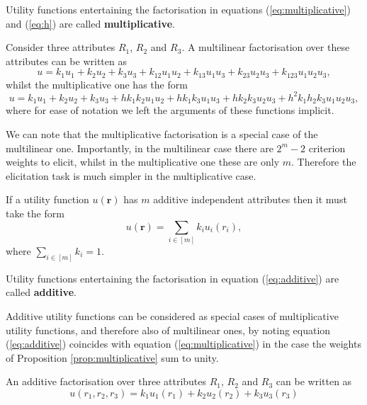 \begin{definition}
\label{def:multiplicative}
Utility functions entertaining the factorisation in equations (\ref{eq:multiplicative}) and (\ref{eq:h}) are called \textbf{multiplicative}.
\end{definition}

\begin{example}
Consider three attributes $R_1$, $R_2$ and $R_3$. A multilinear factorisation over these attributes can be written as
\begin{equation*}
u=k_1u_1+k_2u_2+k_3u_3+k_{12}u_1u_2+k_{13}u_1u_3+k_{23}u_{2}u_3+k_{123}u_1u_2u_3,
\end{equation*}
whilst the multiplicative one has the form
\begin{equation}
\label{eq:examplemultilinear}
u=k_1u_1+k_2u_2+k_3u_3+hk_{1}k_{2}u_1u_2+hk_{1}k_{3}u_1u_3+hk_{2}k_{3}u_{2}u_3+h^2k_{1}h_{2}k_{3}u_1u_2u_3,
\end{equation}
where for ease of notation we left the arguments of these functions implicit.
\end{example}
We can note that the multiplicative factorisation is a special case of the multilinear one.  Importantly, in the multilinear case there are $2^m-2$ criterion weights to elicit, whilst in the multiplicative one these are only $m$. Therefore the elicitation task is much simpler in the multiplicative case. 

\begin{proposition}
If a utility function $u(\bm{r})$ has $m$ additive independent attributes then it must take the form
\begin{equation}
\label{eq:additive}
u(\bm{r})=\sum_{i\in[m]}k_iu_i(r_i),
\end{equation}
where $\sum_{i\in [m]}k_i=1$.
\end{proposition}

\begin{definition}
Utility functions entertaining the factorisation in equation (\ref{eq:additive}) are called \textbf{additive}.
\end{definition}

Additive utility functions can be considered as special cases of multiplicative utility functions, and therefore also of multilinear ones, by noting equation (\ref{eq:additive}) coincides with equation (\ref{eq:multiplicative}) in the case the weights of Proposition \ref{prop:multiplicative} sum to unity.

\begin{example}
An additive factorisation over three attributes $R_1$, $R_2$ and $R_3$ can be written as
\begin{equation*}
\label{eq:exampleadditive}
u(r_1,r_2,r_3)=k_1u_1(r_1)+k_2u_2(r_2)+k_3u_3(r_3)
\end{equation*}
\end{example}

